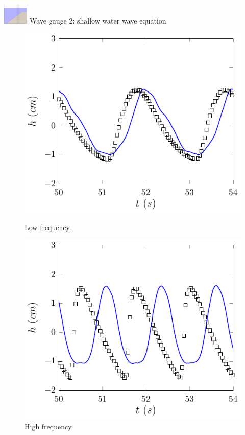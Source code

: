 \documentclass[pdf]{beamer}
\begin{document}
\begin{frame}{\includegraphics[width=1.2cm]{./Pics/WT2z.pdf} \hspace{1cm} Wave gauge 2: shallow water wave equation \hspace*{\fill}  }
	\begin{figure}
		\centering
		\begin{minipage}{.5\textwidth}
			\centering
			\includegraphics[width=0.9\linewidth]{./Pics/SL/WG2/1SWW-figure0.pdf}
			\caption{Low frequency.}
		\end{minipage}%
		\begin{minipage}{.5\textwidth}
			\centering
			\includegraphics[width=0.9\linewidth]{./Pics/SH/WG2/1SWW-figure0.pdf}
			\caption{High frequency.}
		\end{minipage}
	\end{figure}
\end{frame}
\end{document}

